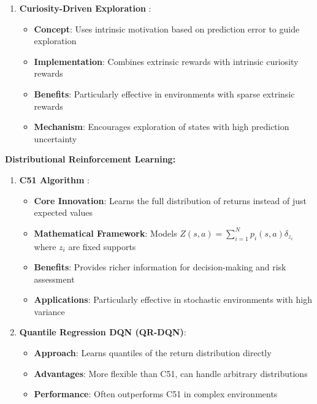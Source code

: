 \documentclass[12pt]{article}
\begin{document}
{{{\begin{enumerate}
    \item \textbf{Curiosity-Driven Exploration} \cite{pathak2017curiosity}:
    \begin{itemize}
        \item \textbf{Concept}: Uses intrinsic motivation based on prediction error to guide exploration
        \item \textbf{Implementation}: Combines extrinsic rewards with intrinsic curiosity rewards
        \item \textbf{Benefits}: Particularly effective in environments with sparse extrinsic rewards
        \item \textbf{Mechanism}: Encourages exploration of states with high prediction uncertainty
    \end{itemize}
\end{enumerate}

\textbf{Distributional Reinforcement Learning:}

\begin{enumerate}
    \item \textbf{C51 Algorithm} \cite{bellemare2017distributional}:
    \begin{itemize}
        \item \textbf{Core Innovation}: Learns the full distribution of returns instead of just expected values
        \item \textbf{Mathematical Framework}: Models $Z(s,a) = \sum_{i=1}^N p_i(s,a) \delta_{z_i}$ where $z_i$ are fixed supports
        \item \textbf{Benefits}: Provides richer information for decision-making and risk assessment
        \item \textbf{Applications}: Particularly effective in stochastic environments with high variance
    \end{itemize}
    
    \item \textbf{Quantile Regression DQN (QR-DQN)}:
    \begin{itemize}
        \item \textbf{Approach}: Learns quantiles of the return distribution directly
        \item \textbf{Advantages}: More flexible than C51, can handle arbitrary distributions
        \item \textbf{Performance}: Often outperforms C51 in complex environments
    \end{itemize}
\end{enumerate}

}}}
\end{document}
